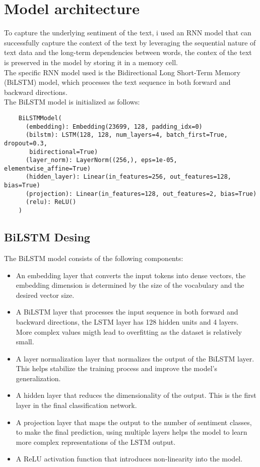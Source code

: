 \documentclass[11pt,a4paper]{article}
\begin{document}
\section{Model architecture}
To capture the underlying sentiment of the text, i used an RNN model that can successfully capture the context of the text by leveraging the sequential nature
of text data and the long-term dependencies between words, the contex of the text is preserved in the model by storing it in a memory cell.
\\The specific RNN model used is the Bidirectional Long Short-Term Memory (BiLSTM) model, which processes the text sequence in both forward and backward directions.
\\The BiLSTM model is initialized as follows:


\begin{adjustbox}{width=0.5\columnwidth}
\begin{minipage}{\linewidth}
\begin{verbatim}
    BiLSTMModel(
      (embedding): Embedding(23699, 128, padding_idx=0)
      (bilstm): LSTM(128, 128, num_layers=4, batch_first=True, dropout=0.3,
       bidirectional=True)
      (layer_norm): LayerNorm((256,), eps=1e-05, elementwise_affine=True)
      (hidden_layer): Linear(in_features=256, out_features=128, bias=True)
      (projection): Linear(in_features=128, out_features=2, bias=True)
      (relu): ReLU()
    )
\end{verbatim}
\end{minipage}
\end{adjustbox}

\subsection{BiLSTM Desing}
The BiLSTM model consists of the following components:
\begin{itemize}
    \item An embedding layer that converts the input tokens into dense vectors, the embedding dimension is determined by the size of the vocabulary and the desired vector size.
    \item A BiLSTM layer that processes the input sequence in both forward and backward directions, the LSTM layer has 128 hidden units and 4 layers.\\ More complex values migth lead to overfitting as the dataset is relatively small.
    \item A layer normalization layer that normalizes the output of the BiLSTM layer. This helps stabilize the training process and improve the model's generalization.
    \item A hidden layer that reduces the dimensionality of the output. This is the first layer in the final classification network.
    \item A projection layer that maps the output to the number of sentiment classes, to make the final prediction, using multiple layers helps the model to learn more complex representations of the LSTM output.
    \item A ReLU activation function that introduces non-linearity into the model.
\end{itemize}
\end{document}
